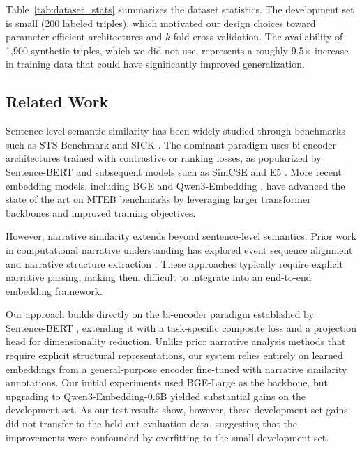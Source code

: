 \documentclass[11pt]{article}
\begin{document}
Table~\ref{tab:dataset_stats} summarizes the dataset statistics. The development set is small (200 labeled triples), which motivated our design choices toward parameter-efficient architectures and $k$-fold cross-validation. The availability of 1,900 synthetic triples, which we did not use, represents a roughly 9.5$\times$ increase in training data that could have significantly improved generalization.


\subsection{Related Work}

Sentence-level semantic similarity has been widely studied through benchmarks such as STS Benchmark \cite{cer-etal-2017} and SICK \cite{marelli-etal-2014}. The dominant paradigm uses bi-encoder architectures trained with contrastive or ranking losses, as popularized by Sentence-BERT \cite{reimers-gurevych-2019} and subsequent models such as SimCSE \cite{gao-etal-2021} and E5 \cite{wang-etal-2022-text}. More recent embedding models, including BGE \cite{xiao-etal-2023-bge} and Qwen3-Embedding \cite{qwen3-embedding}, have advanced the state of the art on MTEB benchmarks \cite{muennighoff-etal-2023-mteb} by leveraging larger transformer backbones and improved training objectives.

However, narrative similarity extends beyond sentence-level semantics. Prior work in computational narrative understanding has explored event sequence alignment \cite{chambers-jurafsky-2008} and narrative structure extraction \cite{reagan-etal-2016}. These approaches typically require explicit narrative parsing, making them difficult to integrate into an end-to-end embedding framework.

Our approach builds directly on the bi-encoder paradigm established by Sentence-BERT \cite{reimers-gurevych-2019}, extending it with a task-specific composite loss and a projection head for dimensionality reduction. Unlike prior narrative analysis methods that require explicit structural representations, our system relies entirely on learned embeddings from a general-purpose encoder fine-tuned with narrative similarity annotations. Our initial experiments used BGE-Large \cite{xiao-etal-2023-bge} as the backbone, but upgrading to Qwen3-Embedding-0.6B \cite{qwen3-embedding} yielded substantial gains on the development set. As our test results show, however, these development-set gains did not transfer to the held-out evaluation data, suggesting that the improvements were confounded by overfitting to the small development set.
\end{document}
